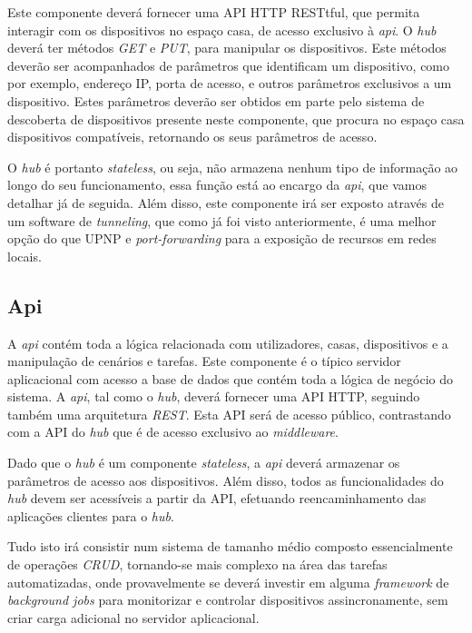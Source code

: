Este componente deverá fornecer uma API HTTP RESTtful, que permita interagir com os dispositivos no espaço casa, de acesso exclusivo à \textit{api}. O \textit{hub} deverá ter métodos \textit{GET} e \textit{PUT}, para manipular os dispositivos. Este métodos deverão ser acompanhados de parâmetros que identificam um dispositivo, como por exemplo, endereço IP, porta de acesso, e outros parâmetros exclusivos a um dispositivo. Estes parâmetros deverão ser obtidos em parte pelo sistema de descoberta de dispositivos presente neste componente, que procura no espaço casa dispositivos compatíveis, retornando os seus parâmetros de acesso. 

O \textit{hub} é portanto \textit{stateless}, ou seja, não armazena nenhum tipo de informação ao longo do seu funcionamento, essa função está ao encargo da \textit{api}, que vamos detalhar já de seguida. Além disso, este componente irá ser exposto através de um software de \textit{tunneling}, que como já foi visto anteriormente, é uma melhor opção do que UPNP e \textit{port-forwarding} para a exposição de recursos em redes locais.

\subsection{Api}

A \textit{api} contém toda a lógica relacionada com utilizadores, casas, dispositivos e a manipulação de cenários e tarefas. Este componente é o típico servidor aplicacional com acesso a base de dados que contém toda a lógica de negócio do sistema. A \textit{api}, tal como o \textit{hub}, deverá fornecer uma API HTTP, seguindo também uma arquitetura \textit{REST}. Esta API será de acesso público, contrastando com a API do \textit{hub} que é de acesso exclusivo ao \textit{middleware}.

Dado que o \textit{hub} é um componente \textit{stateless}, a \textit{api} deverá armazenar os parâmetros de acesso aos dispositivos. Além disso, todos as funcionalidades do \textit{hub} devem ser acessíveis a partir da API, efetuando reencaminhamento das aplicações clientes para o \textit{hub}.

Tudo isto irá consistir num sistema de tamanho médio composto essencialmente de operações \textit{CRUD}, tornando-se mais complexo na área das tarefas automatizadas, onde provavelmente se deverá investir em alguma \textit{framework} de \textit{background jobs} para monitorizar e controlar dispositivos assincronamente, sem criar carga adicional no servidor aplicacional.

